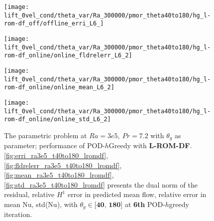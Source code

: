 \begin{figure}[h!]
    \begin{minipage}[b]{.25\linewidth}
        \centering \texttt{[image: lift\_0vel\_cond/theta\_var/Ra\_300000/pmor\_theta40to180/hg\_l-rom-df\_off/offline\_erri\_L6\_]}
        \label{fig:erri_ra3e5_t40to180_lromdf}
    \end{minipage}%
    \begin{minipage}[b]{.25\linewidth}
        \centering \texttt{[image: lift\_0vel\_cond/theta\_var/Ra\_300000/pmor\_theta40to180/hg\_l-rom-df\_online/online\_fldrelerr\_L6\_2]}
        \label{fig:fldrelerr_ra3e5_t40to180_lromdf}
    \end{minipage}
    \begin{minipage}[b]{.25\linewidth}
        \centering \texttt{[image: lift\_0vel\_cond/theta\_var/Ra\_300000/pmor\_theta40to180/hg\_l-rom-df\_online/online\_mean\_L6\_2]}
        \label{fig:mean_ra3e5_t40to180_lromdf}
    \end{minipage}%
    \begin{minipage}[b]{.25\linewidth}
        \centering \texttt{[image: lift\_0vel\_cond/theta\_var/Ra\_300000/pmor\_theta40to180/hg\_l-rom-df\_online/online\_std\_L6\_2]}
        \label{fig:std_ra3e5_t40to180_lromdf}
    \end{minipage} 
    \caption{The parametric problem at $Ra=3e5,~Pr=7.2$ with $\theta_g$ as
    parameter; performance of POD-$h$Greedy with \textbf{L-ROM-DF}.  \ref{fig:erri_ra3e5_t40to180_lromdf},
    \ref{fig:fldrelerr_ra3e5_t40to180_lromdf}, \ref{fig:mean_ra3e5_t40to180_lromdf}, \ref{fig:std_ra3e5_t40to180_lromdf}
    presents the dual norm of the residual, relative $H^1$ error in predicted
    mean flow, relative error in mean Nu, std(Nu), with $\theta_g \in
    \textbf{[40,~180]}$ at \textbf{6th} POD-$h$greedy iteration.}
    \label{fig:online_ra3e5_t40to180_lromdf} 
\end{figure}

